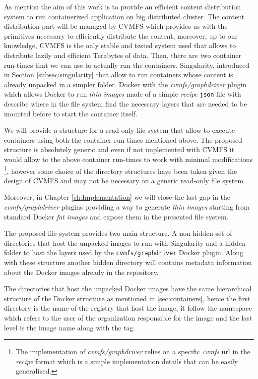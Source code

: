 As mention the aim of this work is to provide an efficient content distribution
system to run containerized application on big distributed cluster.  The
content distribution part will be managed by CVMFS which provides us with the
primitives necessary to efficiently distribute the content, moreover, up to our
knowledge, CVMFS is the only stable and tested system used that allows to
distribute lazily and efficient Terabytes of data.  Then, there are two
container run-times that we can use to actually run the containers.
Singularity, introduced in Section \ref{subsec:singularity} that allow to run
containers whose content is already unpacked in a simpler folder. Docker with
the \textit{cvmfs/graphdriver} plugin which allows Docker to run \textit{thin
images} made of a simple \textit{recipe} \texttt{json} file with describe where
in the file system find the necessary layers that are needed to be mounted
before to start the container itself.

We will provide a structure for a read-only file system that allow to execute
containers using both the container run-times mentioned above. The proposed
structure is absolutely generic and even if not implemented with CVMFS it would
allow to the above container run-times to work with minimal modifications
\footnote{The implementation of \textit{cvmfs/graphdriver} relies on a specific
\textit{cvmfs} url in the \textit{recipe} format which is a simple
implementation details that can be easily generalized.}, however some choice of
the directory structures have been taken given the design of CVMFS and may not
be necessary on a generic read-only file system.

Moreover, in Chapter \ref{ch:Implementation} we will close the last gap in the
\textit{cvmfs/graphdriver} plugins providing a way to generate \textit{thin
images} starting from standard Docker \textit{fat images} and expose them in
the presented file system.

The proposed file-system provides two main structure. A non-hidden set of
directories that host the unpacked images to run with Singularity and a hidden
folder to host the layers used by the \texttt{cvmfs/graphdriver} Docker plugin.
Along with these structure another hidden directory will contains metadata
information about the Docker images already in the repository.

The directories that host the unpacked Docker images have the same hierarchical
structure of the Docker structure as mentioned in \ref{sec:containers}, hence
the first directory is the name of the registry that host the image, it follow
the namespace which refers to the user of the organization responsible for the
image and the last level is the image name along with the tag.

